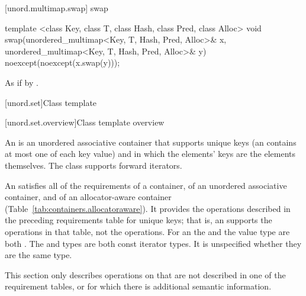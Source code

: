 [unord.multimap.swap]{ swap}

%
\begin{itemdecl}
template <class Key, class T, class Hash, class Pred, class Alloc>
  void swap(unordered_multimap<Key, T, Hash, Pred, Alloc>& x,
            unordered_multimap<Key, T, Hash, Pred, Alloc>& y)
    noexcept(noexcept(x.swap(y)));
\end{itemdecl}


\begin{itemdescr}
\pnum\effects As if by .
\end{itemdescr}

[unord.set]{Class template }%

[unord.set.overview]{Class template  overview}

\pnum
{}%
%
An  is an unordered associative container that
supports unique keys (an  contains at most one of each
key value) and in which the elements' keys are the elements
themselves.
The  class
supports forward iterators.

\pnum
An  satisfies all of the requirements of a container, of an unordered associative container, and of an allocator-aware container (Table~\ref{tab:containers.allocatoraware}). It provides the operations described in the preceding requirements table for unique keys; that is, an  supports the  operations in that table, not the  operations. For an  the  and the value type are both . The  and  types are both const iterator types. It is unspecified whether they are the same type.

\pnum
This section only describes operations on  that
are not described in one of the requirement tables, or for which there
is additional semantic information.

